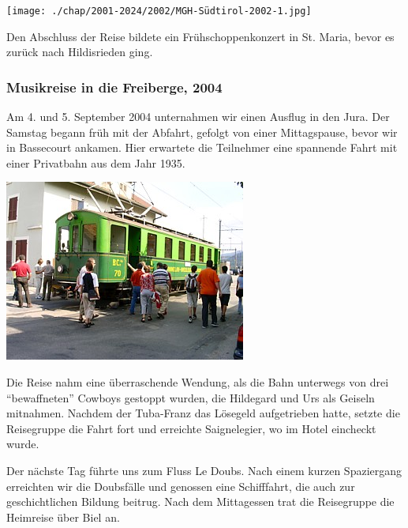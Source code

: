 \begin{history}
    \begin{MulticolFigure}
        \centering
        \texttt{[image: ./chap/2001-2024/2002/MGH-Südtirol-2002-1.jpg]}
    \end{MulticolFigure}

    Den Abschluss der Reise bildete ein Frühschoppenkonzert in St. Maria, bevor
    es zurück nach Hildisrieden ging.

    \subsubsection*{Musikreise in die Freiberge, 2004}

    Am 4. und 5. September 2004 unternahmen wir einen Ausflug in den Jura. Der
    Samstag begann früh mit der Abfahrt, gefolgt von einer Mittagspause, bevor
    wir in Bassecourt ankamen. Hier erwartete die Teilnehmer eine spannende
    Fahrt mit einer Privatbahn aus dem Jahr 1935.

    \begin{MulticolFigure}
        \centering
        \includegraphics[width=0.7\linewidth]{./chap/2001-2024/2004/musikreise2004_03.jpg}
    \end{MulticolFigure}

    Die Reise nahm eine überraschende Wendung, als die Bahn unterwegs von drei
    \enquote{bewaffneten} Cowboys gestoppt wurden, die Hildegard und Urs als
    Geiseln mitnahmen. Nachdem der Tuba-Franz das Lösegeld aufgetrieben hatte,
    setzte die Reisegruppe die Fahrt fort und erreichte Saignelegier, wo im
    Hotel eincheckt wurde.

    Der nächste Tag führte uns zum Fluss Le Doubs. Nach einem kurzen Spaziergang
    erreichten wir die Doubsfälle und genossen eine Schifffahrt, die auch zur
    geschichtlichen Bildung beitrug. Nach dem Mittagessen trat die Reisegruppe
    die Heimreise über Biel an.

\end{history}

